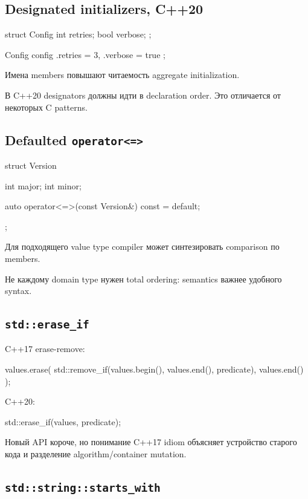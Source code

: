 \subsection{Designated initializers, C++20}

\begin{cppcode}
struct Config {
    int retries;
    bool verbose;
};

Config config{
    .retries = 3,
    .verbose = true
};
\end{cppcode}

Имена members повышают читаемость aggregate initialization.

В C++20 designators должны идти в declaration order. Это отличается от
некоторых C patterns.

\subsection{Defaulted \texttt{operator<=>}}

\begin{cppcode}
struct Version {
    int major;
    int minor;

    auto operator<=>(const Version&) const = default;
};
\end{cppcode}

Для подходящего value type compiler может синтезировать comparison по members.

Не каждому domain type нужен total ordering: semantics важнее удобного syntax.

\subsection{\texttt{std::erase\_if}}

C++17 erase-remove:

\begin{cppcode}
values.erase(
    std::remove_if(values.begin(), values.end(), predicate),
    values.end()
);
\end{cppcode}

C++20:

\begin{cppcode}
std::erase_if(values, predicate);
\end{cppcode}

Новый API короче, но понимание C++17 idiom объясняет устройство старого кода и
разделение algorithm/container mutation.

\subsection{\texttt{std::string::starts\_with}}

